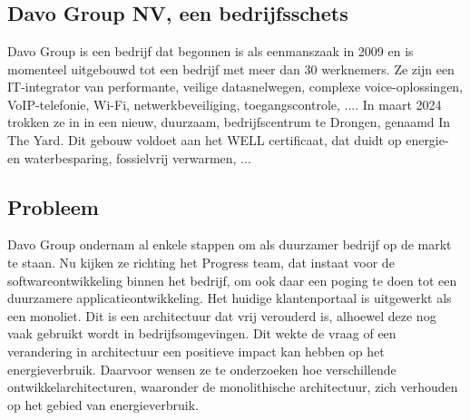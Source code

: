 

\section{}%
\label{sec:probleemstelling}
\subsection{Davo Group NV, een bedrijfsschets}
Davo Group is een bedrijf dat begonnen is als eenmanszaak in 2009 en is momenteel uitgebouwd tot een bedrijf met meer dan 30 werknemers. Ze zijn een IT-integrator van performante, veilige datasnelwegen, complexe voice-oplossingen, VoIP-telefonie, Wi-Fi, netwerkbeveiliging, toegangscontrole, .... In maart 2024 trokken ze in in een nieuw, duurzaam, bedrijfscentrum te Drongen, genaamd In The Yard. Dit gebouw voldoet aan het WELL certificaat, dat duidt op energie- en waterbesparing, fossielvrij verwarmen, ...

\subsection{Probleem}
Davo Group ondernam al enkele stappen om als duurzamer bedrijf op de markt te staan. Nu kijken ze richting het Progress team, dat instaat voor de softwareontwikkeling binnen het bedrijf, om ook daar een poging te doen tot een duurzamere applicatieontwikkeling. Het huidige klantenportaal is uitgewerkt als een monoliet. Dit is een architectuur dat vrij verouderd is, alhoewel deze nog vaak gebruikt wordt in bedrijfsomgevingen. Dit wekte de vraag of een verandering in architectuur een positieve impact kan hebben op het energieverbruik. Daarvoor wensen ze te onderzoeken hoe verschillende ontwikkelarchitecturen, waaronder de monolithische architectuur, zich verhouden op het gebied van energieverbruik.
 
